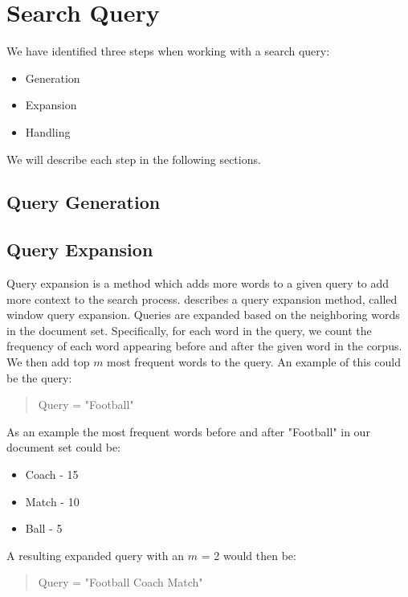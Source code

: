 \section{Search Query}
We have identified three steps when working with a search query:
\begin{itemize}
	\item Generation
	\item Expansion
	\item Handling
\end{itemize}

We will describe each step in the following sections.

\subsection{Query Generation}


\subsection{Query Expansion}
Query expansion is a method which adds more words to a given query to add more context to the search process.
\citet{yang2009topic} describes a query expansion method, called window query expansion.
Queries are expanded based on the neighboring words in the document set.
Specifically, for each word in the query, we count the frequency of each word appearing before and after the given word in the corpus.
We then add top $m$ most frequent words to the query.
An example of this could be the query: 
\begin{quote}
	Query = "Football"
\end{quote}
As an example the most frequent words before and after "Football" in our document set could be:
\begin{itemize}
	\item Coach - 15
	\item Match - 10
	\item Ball - 5
\end{itemize}
A resulting expanded query with an $m$ = 2 would then be:
\begin{quote}
	Query = "Football Coach Match"
\end{quote}



